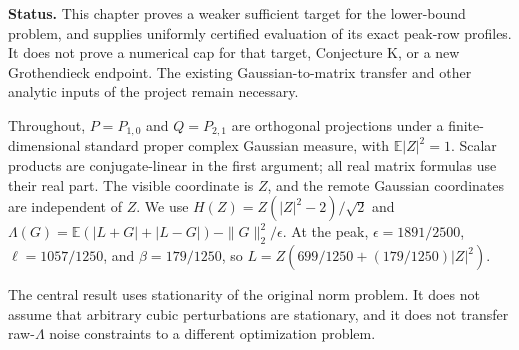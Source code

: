 \noindent\textbf{Status.} This chapter proves a weaker sufficient target for the
lower-bound problem, and supplies uniformly certified evaluation of its exact
peak-row profiles. It does not prove a numerical cap for that target, Conjecture
K, or a new Grothendieck endpoint. The existing Gaussian-to-matrix transfer and
other analytic inputs of the project remain necessary.

Throughout, $P=P_{1,0}$ and $Q=P_{2,1}$ are orthogonal projections under a
finite-dimensional standard proper complex Gaussian measure, with
$\mathbb E|Z|^2=1$. Scalar products are conjugate-linear in the first argument;
all real matrix formulas use their real part. The visible coordinate is $Z$,
and the remote Gaussian coordinates are independent of $Z$.
We use $H(Z)=Z(|Z|^2-2)/\sqrt2$ and
$\Lambda(G)=\mathbb E(|L+G|+|L-G|)-\|G\|_2^2/\epsilon$.
At the peak, $\epsilon=1891/2500$, $\ell=1057/1250$, and
$\beta=179/1250$, so $L=Z(699/1250+(179/1250)|Z|^2)$.

The central result uses stationarity of the original norm problem. It does not
assume that arbitrary cubic perturbations are stationary, and it does not
transfer raw-$\Lambda$ noise constraints to a different optimization problem.


